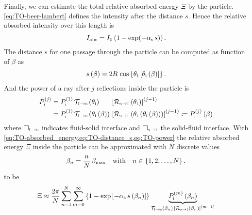 Finally, we can estimate the total relative absorbed energy $\Xi$ by the 
particle. \cref{eq:TO-beer-lambert} defines the intensity after the distance 
$s$. Hence the relative absorbed intensity over this length is
\begin{equation}
  I_{\mathrm{abs}} = I_{0} \left( 1 - \exp(-\alpha_{\mathrm{s}}\,s) 
  \right).
    \label{eq:TO-absorbed_energy}
\end{equation}
The distance $s$ for one passage through the particle can be computed as 
function of $\beta$ as
\begin{equation}
  s\left( \beta \right) = 2R\,\cos\left\{ \theta_{\mathrm{t}}\left[ \theta_{\mathrm{i}}\left( 
  \beta \right) \right] \right\}.
    \label{eq:TO-distance_s}
\end{equation}
And the power of a ray after $j$ reflections inside the particle is
\begin{equation}
  \begin{alignedat}{3}
    P_{\mathrm{i}}^{(j)} &=
    P_{\mathrm{i}}^{(1)} \, &&
    \mathcal{T}_{\mathrm{f}\rightarrow\mathrm{s}}\left( \theta_{\mathrm{i}} \right) \, &&
    \left[\mathcal{R}_{\mathrm{s}\rightarrow\mathrm{f}}\left( \theta_{\mathrm{t}} 
    \right)\right]^{(j-1)}\\
    &=
    P_{\mathrm{i}}^{(1)} \, &&
    \mathcal{T}_{\mathrm{f}\rightarrow\mathrm{s}}
    \left( \theta_{\mathrm{i}}\left( \beta \right) \right) \, &&
    \left[
      \mathcal{R}_{\mathrm{s}\rightarrow\mathrm{f}}
      \left( \theta_{\mathrm{t}}\left( \theta_{\mathrm{i}}\left( \beta \right) \right) \right)
  \right]^{(j-1)} \coloneqq P_{\mathrm{i}}^{(j)}\left( \beta \right)
  \end{alignedat}
  \label{eq:TO-power}
\end{equation}
where $\Box_{\mathrm{f}\rightarrow\mathrm{s}}$ indicates fluid-solid interface and 
$\Box_{\mathrm{s}\rightarrow\mathrm{f}}$ the solid-fluid interface. With 
\cref{eq:TO-absorbed_energy,eq:TO-distance_s,eq:TO-power} the relative absorbed 
energy $\Xi$ inside the particle can be approximated with $N$ discrete values
\begin{equation}
  \beta_{n} = \frac{n}{N}\,\beta_{\mathrm{max}}\quad\text{with}\quad 
  n\in\left\{1,2,\ldots,N\right\}.
  \label{eq:TO-beta-disc}
\end{equation}
to be
\begin{equation}
    \Xi \approx
    \frac{2\pi}{N}
    \sum\limits_{n=1}^{N}
    \sum\limits_{m=0}^{\infty}
    \left\{ 1 - \exp\left[-\alpha_{\mathrm{s}}\,s\left( \beta_{n} \right) \right] 
    \right\}
    \underbrace{P_{\mathrm{i}}^{(m)}\left( \beta_{n} \right)}_{
    \mathcal{T}_{\mathrm{f}\rightarrow\mathrm{s}}\left( \beta_{n}\right) \,
    \left[\mathcal{R}_{\mathrm{s}\rightarrow\mathrm{f}}\left(\beta_{n}\right)\right]^{(m-1)}
}
  \label{eq:TO-total-absorbed}
\end{equation}

